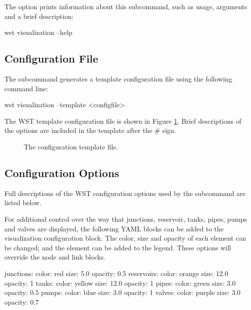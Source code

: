 The  option prints information about this subcommand, such as usage,
arguments and a brief description:

\begin{unknownListing}
wst visualization --help
\end{unknownListing}

\subsection{Configuration File}

The  subcommand generates a template configuration file using the following command line:

\begin{unknownListing}
wst visualization --template <configfile>
\end{unknownListing}

The  WST template configuration file is shown in Figure \ref{fig:visualization_template}. 
Brief descriptions of the options are included in the template after the \# sign.  

\begin{figure}[H]
  \caption{The  configuration template file.}
  \label{fig:visualization_template}
\end{figure}
  
\subsection{Configuration Options}

Full descriptions of the WST configuration options used by the  subcommand are listed below.


For additional control over the way that junctions, reservoir, tanks, pipes, pumps and valves are
displayed, the following YAML blocks can be added to the visualization configuration block.
The color, size and opacity of each element can be changed; and the element can
be added to the legend. These options will override the node and link blocks.
\begin{unknownListing}
  junctions:
    color: red  
    size: 5.0
    opacity: 0.5
  reservoirs:
    color: orange
    size: 12.0
    opacity: 1
  tanks:
    color: yellow
    size: 12.0
    opacity: 1
  pipes:
    color: green
    size: 3.0
    opacity: 0.5
  pumps:
    color: blue
    size: 3.0
    opacity: 1
  valves:
    color: purple
    size: 3.0
    opacity: 0.7
\end{unknownListing}
